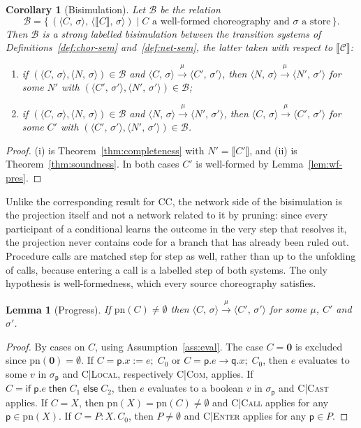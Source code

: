 \documentclass[11pt]{article}
\theoremstyle{plain}
\newtheorem{lemma}[theorem]{Lemma}
\newtheorem{corollary}[theorem]{Corollary}
\theoremstyle{definition}
\theoremstyle{remark}
\newcommand{\kw}[1]{\mathsf{#1}}
\newcommand{\kif}{\kw{if}\;}
\newcommand{\kthen}{\;\kw{then}\;}
\newcommand{\kelse}{\;\kw{else}\;}
\newcommand{\nil}{\mathbf{0}}
\newcommand{\seq}{;\;}
\newcommand{\pp}{\mathsf{p}}
\newcommand{\qq}{\mathsf{q}}
\newcommand{\pn}{\mathrm{pn}}
\newcommand{\conf}[2]{\langle #1,\, #2\rangle}
\newcommand{\lto}[1]{\xrightarrow{\;#1\;}}
\newcommand{\projn}[1]{\llbracket #1 \rrbracket}
\newcommand{\rn}[1]{{\normalfont\scshape #1}}
\newcommand{\ifcond}[3]{\kif #1 \kthen #2 \kelse #3}
\newcommand{\Bis}{\mathcal{B}}
\newcommand{\Defs}{\mathcal{C}}
\newcommand{\rt}[3]{#1\mathbin{:}#2.\,#3}
\begin{document}
\begin{corollary}[Bisimulation]\label{cor:bisim}
  Let $\Bis$ be the relation
  \[
    \Bis = \{\,(\conf{C}{\sigma},\, \conf{\projn{C}}{\sigma}) \mid C \text{ a well-formed choreography and } \sigma \text{ a store}\,\}.
  \]
  Then $\Bis$ is a strong labelled bisimulation between the transition
  systems of Definitions~\ref{def:chor-sem} and~\ref{def:net-sem}, the latter
  taken with respect to $\projn{\Defs}$:
  \begin{enumerate}[label=(\roman*),nosep]
  \item if $(\conf{C}{\sigma}, \conf{N}{\sigma})\in\Bis$ and
    $\conf{C}{\sigma}\lto{\mu}\conf{C'}{\sigma'}$, then
    $\conf{N}{\sigma}\lto{\mu}\conf{N'}{\sigma'}$ for some $N'$ with
    $(\conf{C'}{\sigma'}, \conf{N'}{\sigma'})\in\Bis$;
  \item if $(\conf{C}{\sigma}, \conf{N}{\sigma})\in\Bis$ and
    $\conf{N}{\sigma}\lto{\mu}\conf{N'}{\sigma'}$, then
    $\conf{C}{\sigma}\lto{\mu}\conf{C'}{\sigma'}$ for some $C'$ with
    $(\conf{C'}{\sigma'}, \conf{N'}{\sigma'})\in\Bis$.
  \end{enumerate}
\end{corollary}
\begin{proof}
  (i) is Theorem~\ref{thm:completeness} with $N' = \projn{C'}$, and (ii) is
  Theorem~\ref{thm:soundness}.  In both cases $C'$ is well-formed by
  Lemma~\ref{lem:wf-pres}.
\end{proof}

Unlike the corresponding result for CC, the network side of the bisimulation
is the projection itself and not a network related to it by pruning: since
every participant of a conditional learns the outcome in the very step that
resolves it, the projection never contains code for a branch that has
already been ruled out.  Procedure calls are matched step for step as well,
rather than up to the unfolding of calls, because entering a call is a
labelled step of both systems.  The only hypothesis is well-formedness, which
every source choreography satisfies.

\begin{lemma}[Progress]\label{lem:progress}
  If $\pn(C)\neq\emptyset$ then $\conf{C}{\sigma}\lto{\mu}\conf{C'}{\sigma'}$
  for some $\mu$, $C'$ and $\sigma'$.
\end{lemma}
\begin{proof}
  By cases on $C$, using Assumption~\ref{ass:eval}.  The case $C = \nil$ is
  excluded since $\pn(\nil) = \emptyset$.  If $C = \pp.x := e\seq C_0$
  or $C = \pp.e\to\qq.x\seq C_0$, then $e$ evaluates to some $v$ in
  $\sigma_\pp$ and \rn{C|Local}, respectively \rn{C|Com}, applies.  If
  $C = \ifcond{\pp.e}{C_1}{C_2}$, then $e$ evaluates to a boolean $v$ in
  $\sigma_\pp$ and \rn{C|Cast} applies.  If $C = X$, then
  $\pn(X) = \pn(C)\neq\emptyset$ and \rn{C|Call} applies for any
  $\pp\in\pn(X)$.  If $C = \rt{P}{X}{C_0}$, then $P\neq\emptyset$ and
  \rn{C|Enter} applies for any $\pp\in P$.
\end{proof}
\end{document}
